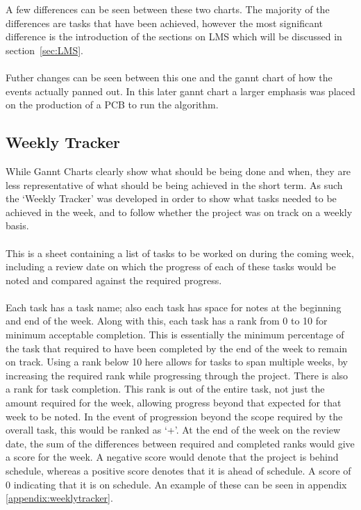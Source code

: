\noindent
A few differences can be seen between these two charts.
The majority of the differences are tasks that have been achieved, however the most significant difference is the introduction of the sections on LMS which will be discussed in section~\ref{sec:LMS}.
\\
\\
Futher changes can be seen between this one and the gannt chart of how the events actually panned out.
In this later gannt chart a larger emphasis was placed on the production of a PCB to run the algorithm.

\subsection{Weekly Tracker}
While Gannt Charts clearly show what should be being done and when, they are less representative of what should be being achieved in the short term.
As such the `Weekly Tracker' was developed in order to show what tasks needed to be achieved in the week, and to follow whether the project was on track on a weekly basis.
\\
\\
This is a sheet containing a list of tasks to be worked on during the coming week, including a review date on which the progress of each of these tasks would be noted and compared against the required progress.
\\
\\
Each task has a task name; also each task has space for notes at the beginning and end of the week.
Along with this, each task has a rank from 0 to 10 for minimum acceptable completion.
This is essentially the minimum percentage of the task that required to have been completed by the end of the week to remain on track.
Using a rank below 10 here allows for tasks to span multiple weeks, by increasing the required rank while progressing through the project.
There is also a rank for task completion.
This rank is out of the entire task, not just the amount required for the week, allowing progress beyond that expected for that week to be noted.
In the event of progression beyond the scope required by the overall task, this would be ranked as `+'.
At the end of the week on the review date, the sum of the differences between required and completed ranks would give a score for the week.
A negative score would denote that the project is behind schedule, whereas a positive score denotes that it is ahead of schedule.
A score of 0 indicating that it is on schedule.
An example of these can be seen in appendix \ref{appendix:weeklytracker}.

